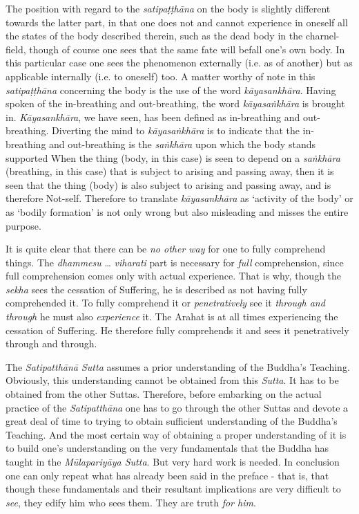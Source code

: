 The position with regard to the \textit{satipaṭṭhāna} on the body is slightly different towards the latter part, in that one does not and cannot experience in oneself all the states of the body described therein, such as the dead body in the charnel-field, though of course one sees that the same fate will befall one's own body. In this particular case one sees the phenomenon externally (i.e. as of another) but as applicable internally (i.e. to oneself) too. A matter worthy of note in this \textit{satipaṭṭhāna} concerning the body is the use of the word \textit{kāyasankhāra}. Having spoken of the in-breathing and out-breathing, the word \textit{kāyasaṅkhāra} is brought in. \textit{Kāyasankhāra}, we have seen, has been defined as in-breathing and out-breathing. Diverting the mind to \textit{kāyasaṅkhāra} is to indicate that the in-breathing and out-breathing is the \textit{saṅkhāra} upon which the body stands supported When the thing (body, in this case) is seen to depend on a \textit{saṅkhāra} (breathing, in this case) that is subject to arising and passing away, then it is seen that the thing (body) is also subject to arising and passing away, and is therefore Not-self. Therefore to translate \textit{kāyasankhāra} as `activity of the body' or as `bodily formation' is not only wrong but also misleading and misses the entire purpose.

It is quite clear that there can be \emph{no other way} for one to fully comprehend things. The \textit{dhammesu} \ldots\hspace{0pt} \textit{viharati} part is necessary for \emph{full} comprehension, since full comprehension comes only with actual experience. That is why, though the \textit{sekha} sees the cessation of Suffering, he is described as not having fully comprehended it. To fully comprehend it or \emph{penetratively} see it \emph{through and through} he must also \emph{experience} it. The Arahat is at all times experiencing the cessation of Suffering. He therefore fully comprehends it and sees it penetratively through and through.

\protect\hypertarget{truth-for-him}{}{}The \textit{Satipatthānā Sutta} assumes a prior understanding of the Buddha's Teaching. Obviously, this understanding cannot be obtained from this \textit{Sutta}. It has to be obtained from the other Suttas. Therefore, before embarking on the actual practice of the \textit{Satipatthāna} one has to go through the other Suttas and devote a great deal of time to trying to obtain sufficient understanding of the Buddha's Teaching. And the most certain way of obtaining a proper understanding of it is to build one's understanding on the very fundamentals that the Buddha has taught in the \textit{Mūlapariyāya Sutta}. But very hard work is needed. In conclusion one can only repeat what has already been said in the preface - that is, that though these fundamentals and their resultant implications are very difficult to \emph{see}, they edify him who sees them. They are truth \emph{for him}.
